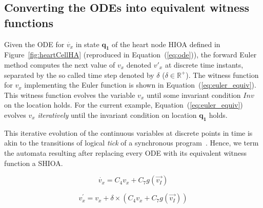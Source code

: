 \subsection{Converting the ODEs into equivalent witness functions}
\label{sec:converting-odes-into}

Given the \ac{ODE} for $\dot{v_x}$ in state $\mathbf{q_1}$ of the heart
node \ac{HIOA} defined in Figure~\ref{fig:heartCellHA} (reproduced in
Equation~(\ref{eq:ode})), the forward Euler method computes the next
value of $v_{x}$ denoted $v'_{x}$ at discrete time instants, separated
by the so called time step denoted by $\delta$
($\delta \in \mathbb{R}^{+}$). The witness function for $v_{x}$
implementing the Euler function is shown in
Equation~(\ref{eq:euler_equiv}). This witness function evolves the
variable $v_{x}$ until some invariant condition $Inv$ on the location
holds. For the current example, Equation~(\ref{eq:euler_equiv}) evolves
$v_{x}$ \emph{iteratively} until the invariant condition on location
$\mathbf{q_{1}}$ holds.

This iterative evolution of the continuous variables at discrete points
in time is akin to the transitions of logical \emph{tick} of a
synchronous program~\cite{benveniste03}. Hence, we term the automata
resulting after replacing every ODE with its equivalent witness function
a \acf{SHIOA}.


\begin{equation}
  \dot{v_x} = C_{4} v_x + C_{7} g(\vec{v_{I}})
  \label{eq:ode}
\end{equation}

\begin{equation}
  v^\prime_x = v_x + \delta \times (C_{4} v_x + C_{7} g(\vec{v_{I}}))
  \label{eq:euler_equiv}
\end{equation}


